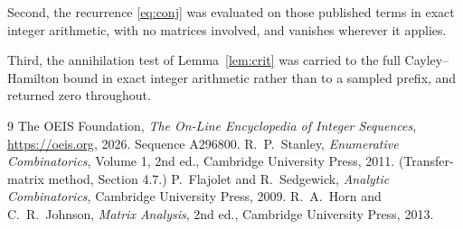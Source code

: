 \documentclass[11pt,a4paper]{article}
\theoremstyle{plain}
\theoremstyle{definition}
\begin{document}
Second, the recurrence \eqref{eq:conj} was evaluated on those published terms in exact
integer arithmetic, with no matrices involved, and vanishes wherever it applies.

Third, the annihilation test of Lemma~\ref{lem:crit} was carried to the full
Cayley--Hamilton bound in exact integer arithmetic rather than to a sampled prefix, and
returned zero throughout.

\begin{thebibliography}{9}
 The OEIS Foundation, \emph{The On-Line Encyclopedia of Integer
Sequences}, \url{https://oeis.org}, 2026. Sequence A296800.
 R.~P.~Stanley, \emph{Enumerative Combinatorics}, Volume 1, 2nd ed.,
Cambridge University Press, 2011. (Transfer-matrix method, Section 4.7.)
 P.~Flajolet and R.~Sedgewick, \emph{Analytic Combinatorics}, Cambridge
University Press, 2009.
 R.~A.~Horn and C.~R.~Johnson, \emph{Matrix Analysis}, 2nd ed., Cambridge
University Press, 2013.
\end{thebibliography}
\end{document}
